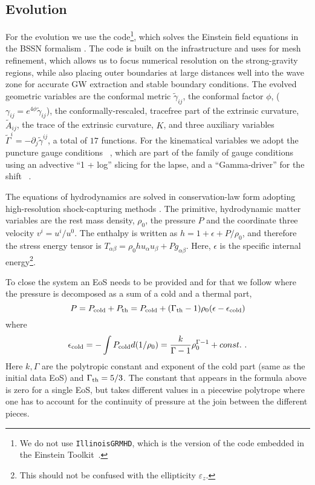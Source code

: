 \documentclass[twocolumn,superscriptaddress,showpacs,prd,aps,amsmath,amssymb,nofootinbib]{revtex4-1}
\newcommand{\GA}{\alpha}
\newcommand{\GB}{\beta}
\newcommand{\GG}{\gamma}
\newcommand{\GE}{\epsilon}
\newcommand{\GR}{\rho}
\newcommand{\GP}{\phi}
\newcommand{\pd}{\partial}
\newcommand{\be}{\begin{equation}}
\newcommand{\ee}{\end{equation}}
\begin{document}
 


\subsection{Evolution}
\label{sec:Evol}

For the evolution we use the \illinois{} code\footnote{We do not use
  {\tt IllinoisGRMHD}, which is the version of the code embedded in the
  Einstein Toolkit~\cite{EPHMS}.}, which solves the Einstein field
equations in the BSSN formalism \cite{SN95,BS98,BS10}.  The code is
built on the \cactus{} \cite{cactus} infrastructure and uses \carpet{} 
for mesh refinement, which allows us to focus numerical resolution on
the strong-gravity regions, while also placing outer boundaries at
large distances well into the wave zone for accurate GW extraction and
stable boundary conditions.  The evolved geometric variables are the
conformal metric $\tilde{\GG}_{ij}$, the conformal factor $\GP$,
($\GG_{ij}=e^{4\GP}\tilde{\GG}_{ij}$), the conformally-rescaled,
tracefree part of the extrinsic curvature, $\tilde{A}_{ij}$, the trace
of the extrinsic curvature, $K$, and three auxiliary variables
$\tilde{\Gamma}^i=-\pd_j\tilde{\GG}^{ij}$, a total of $17$ functions.
For the kinematical variables we adopt the puncture gauge conditions
~\cite{Baker06, Campanelli06,NRAR13}, 
which are part of the family of gauge conditions using an advective 
``1 + log'' slicing for the lapse, and a ``Gamma-driver'' for the
shift ~\cite{ABDKPST03}.
 
The equations of hydrodynamics are solved in conservation-law form adopting
high-resolution shock-capturing methods \cite{EPLS12, ELS10}.  The
primitive, hydrodynamic matter variables are the rest mass density,
$\GR_0$, the pressure $P$ and the coordinate three velocity
$v^i=u^i/u^0$. The enthalpy is written as $h=1+\GE+P/\GR_0$, and
therefore the stress energy tensor is $T_{\GA\GB}=\GR_0 hu_\GA u_\GB+
P g_{\GA\GB}$. Here, $\GE$ is the specific internal
energy\footnote{This should not be confused with the ellipticity
  $\varepsilon_z$.}.

To close the system an EoS needs to be provided and for that 
we follow \cite{PLES10,PLES11} where the pressure is decomposed as a
sum of a cold and a thermal part,
\be
P = P_{\rm cold} + P_{\rm th} = P_{\rm cold} + (\Gamma_{\rm th}-1)\GR_0 (\GE-\GE_{\rm cold})
\label{eq:pre}
\ee where \be \GE_{\rm cold} = -\int P_{\rm cold} d(1/\GR_0)
=\frac{k}{\Gamma-1}\GR_0^{\Gamma-1} + const.\ .  \ee Here $k,\Gamma$
are the polytropic constant and exponent of the cold part (same as the
initial data EoS) and $\Gamma_{\rm th}=5/3$. The constant that appears
in the formula above is zero for a single EoS, but takes different
values in a piecewise polytrope where one has to account for the
continuity of pressure at the join between the different pieces.
\end{document}
